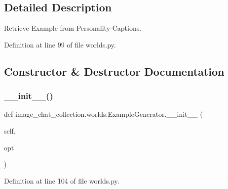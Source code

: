 \subsection{Detailed Description}
\begin{DoxyVerb}Retrieve Example from Personality-Captions.
\end{DoxyVerb}
 

Definition at line 99 of file worlds.\+py.



\subsection{Constructor \& Destructor Documentation}
\mbox{\label{classimage__chat__collection_1_1worlds_1_1ExampleGenerator_a17074787229ef3b12887fa756832d45a}} 
\subsubsection{\texorpdfstring{\+\_\+\+\_\+init\+\_\+\+\_\+()}{\_\_init\_\_()}}
{\footnotesize\ttfamily def image\+\_\+chat\+\_\+collection.\+worlds.\+Example\+Generator.\+\_\+\+\_\+init\+\_\+\+\_\+ (\begin{DoxyParamCaption}\item[{}]{self,  }\item[{}]{opt }\end{DoxyParamCaption})}



Definition at line 104 of file worlds.\+py.


